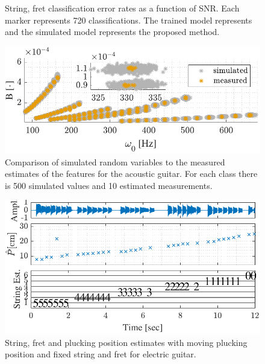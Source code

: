 \documentclass{article}
\begin{document}
\begin{sloppy}
\begin{figure}[t]
   \caption{String, fret classification error rates as a function of SNR. Each marker represents 720 classifications. The trained model represents~\cite{hjerrild::icassp19} and the simulated model represents the proposed method.}
   \label{fig:string_fret_sbr_Electric} 
\end{figure}
%
%
%
\begin{figure}[t]
\centering
   \includegraphics[width=.96\linewidth]{img/w0_vs_B.pdf}\vspace{-2mm}
   \caption{Comparison of simulated random variables to the measured estimates of the features for the acoustic guitar. For each class there is 500 simulated values and 10 estimated measurements.}
   \label{fig:string_fret_sbr_Electric} 
\end{figure}


\begin{figure}[t]
\centering
   \includegraphics[width=.86\linewidth]{img/tablature_constant_note25_LSD}\vspace{-2mm}
   \caption{String, fret and plucking position estimates with moving plucking position and fixed string and fret for electric guitar.}
   \label{fig:pluck_position_fixed_tabs} 
\end{figure}
%

\end{sloppy}
\end{document}
